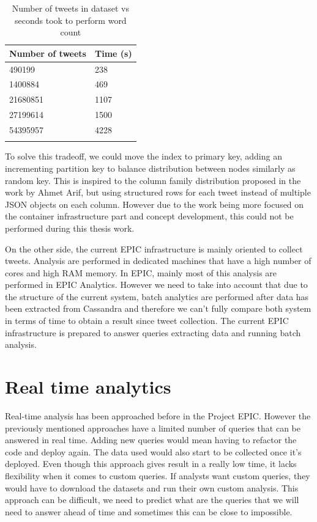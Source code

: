 \begin{table}
\centering
\begin{tabular}{l l}
\toprule
\textbf{Number of tweets} & \textbf{Time (s)} \\
\midrule
490199 & 238 \\
1400884 & 469 \\
21680851 & 1107 \\
27199614 & 1500 \\
54395957 & 4228 \\
\bottomrule\\
\end{tabular}

\caption{Number of tweets in dataset vs seconds took to perform word count}
\label{tab:numtweets}
\end{table}

To solve this tradeoff, we could move the index to primary key, adding an incrementing partition key to balance distribution between nodes similarly as random key. This is inspired to the column family distribution proposed in the work by Ahmet Arif\parencite{batchreal}, but using structured rows for each tweet instead of multiple JSON objects on each column. However due to the work being more focused on the container infrastructure part and concept development, this could not be performed during this thesis work.

On the other side, the current EPIC infrastructure is mainly oriented to collect tweets. Analysis are performed in dedicated machines that have a high number of cores and high RAM memory. In EPIC, mainly most of this analysis are performed in EPIC Analytics. However we need to take into account that due to the structure of the current system, batch analytics are performed after data has been extracted from Cassandra and therefore we can’t fully compare both system in terms of time to obtain a result since tweet collection. The current EPIC infrastructure is prepared to answer queries extracting data and running batch analysis. 


\section{Real time analytics}

Real-time analysis has been approached before in the Project EPIC\parencite{batchreal}. However the previously mentioned approaches have a limited number of queries that can be answered in real time. Adding new queries would mean having to refactor the code and deploy again. The data used would also start to be collected once it’s deployed. Even though this approach gives result in a really low time, it lacks flexibility when it comes to custom queries. If analysts want custom queries, they would have to download the datasets and run their own custom analysis. This approach can be difficult, we need to predict what are the queries that we will need to answer ahead of time and sometimes this can be close to impossible.

